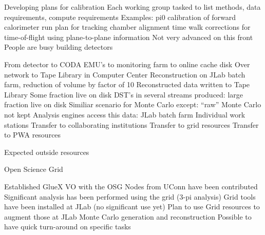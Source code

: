 
\I Developing plans for calibration
   \I Each working group tasked to list methods, data requirements, compute requirements
   \I Examples:
      \I pi0 calibration of forward calorimeter
      \I run plan for tracking chamber alignment
      \I time walk corrections for time-of-flight using plane-to-plane information
\I Not very advanced on this front
\I People are busy building detectors


   \I From detector to CODA EMU's to monitoring farm to online cache disk
   \I Over network to Tape Library in Computer Center
   \I Reconstruction on JLab batch farm, reduction of volume by factor of 10
   \I Reconstructed data written to Tape Library
   \I Some fraction live on disk
   \I DST's in several streams produced: large fraction live on disk
   \I Similiar scenario for Monte Carlo except:
      \I ``raw'' Monte Carlo not kept
   \I Analysis engines access this data:
      \I JLab batch farm
      \I Individual work stations
      \I Transfer to collaborating institutions
      \I Transfer to grid resources
      \I Transfer to PWA resources


Expected outside resources


Open Science Grid

\I Established GlueX VO with the OSG
\I Nodes from UConn have been contributed
\I Significant analysis has been performed using the grid (3-pi analysis)
\I Grid tools have been installed at JLab (no significant use yet)
\I Plan to use Grid resources to augment those at JLab
   \I Monte Carlo generation and reconstruction
   \I Possible to have quick turn-around on specific tasks

